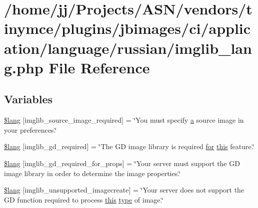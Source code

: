 \hypertarget{application_2language_2russian_2imglib__lang_8php}{}\section{/home/jj/\+Projects/\+A\+S\+N/vendors/tinymce/plugins/jbimages/ci/application/language/russian/imglib\+\_\+lang.php File Reference}
\label{application_2language_2russian_2imglib__lang_8php}
\subsection*{Variables}
\begin{DoxyCompactItemize}
\item 
\hyperlink{application_2language_2russian_2imglib__lang_8php_af48787ab142f633036ebdf1cc5da7409}{\$lang} \mbox{[}\textquotesingle{}imglib\+\_\+source\+\_\+image\+\_\+required\textquotesingle{}\mbox{]} = \char`\"{}You must specify \hyperlink{_chart_8min_8js_aef3b685c08bc6c76c8e729bd0e93901d}{a} source image in your preferences.\char`\"{}
\item 
\hyperlink{application_2language_2russian_2imglib__lang_8php_aa8d7f8276e62fbe759daef2021c16552}{\$lang} \mbox{[}\textquotesingle{}imglib\+\_\+gd\+\_\+required\textquotesingle{}\mbox{]} = \char`\"{}The GD image library is required \hyperlink{jquery-ui_8min_8js_a75bc805cf26ad48d8e8a98f5af2c3e76}{for} \hyperlink{table_2plugin_8min_8js_a05c09a5e9d53fa7adf0a7936038c2fa3}{this} feature.\char`\"{}
\item 
\hyperlink{application_2language_2russian_2imglib__lang_8php_a0da9c99f9e2b5f38ccbefb9d9f702c5e}{\$lang} \mbox{[}\textquotesingle{}imglib\+\_\+gd\+\_\+required\+\_\+for\+\_\+props\textquotesingle{}\mbox{]} = \char`\"{}Your server must support the GD image library in order to determine the image properties.\char`\"{}
\item 
\hyperlink{application_2language_2russian_2imglib__lang_8php_ace032cbe8dafb1f3417a758d0914ecdb}{\$lang} \mbox{[}\textquotesingle{}imglib\+\_\+unsupported\+\_\+imagecreate\textquotesingle{}\mbox{]} = \char`\"{}Your server does not support the GD function required to process \hyperlink{table_2plugin_8min_8js_a05c09a5e9d53fa7adf0a7936038c2fa3}{this} \hyperlink{_ossn_wall_2actions_2wall_2post_2group_8php_a2dc1bb4e1ed0029daa81ac0776b14b51}{type} of image.\char`\"{}

\end{DoxyCompactItemize}
